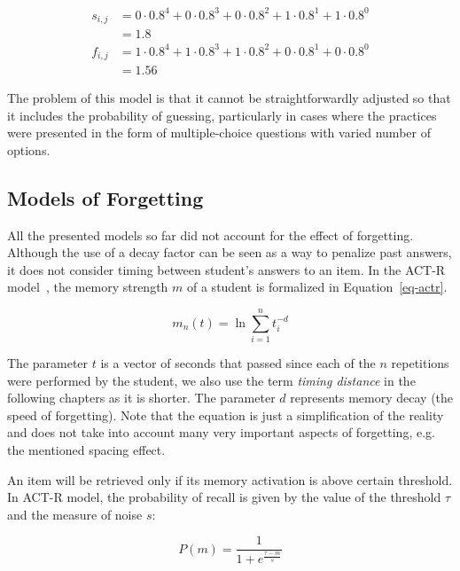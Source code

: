 \begin{equation} \label{eq-pfa-gong-example}
  \begin{split}
  s_{i,j} & = 0 \cdot 0.8^4 + 0 \cdot 0.8^3 + 0 \cdot 0.8^2 + 1 \cdot 0.8^1 + 1 \cdot 0.8^0 \\
  & = 1.8 \\
  f_{i,j} & = 1 \cdot 0.8^4 + 1 \cdot 0.8^3 + 1 \cdot 0.8^2 + 0 \cdot 0.8^1 + 0 \cdot 0.8^0 \\
  & = 1.56
  \end{split}
\end{equation}

The problem of this model is that it cannot be straightforwardly adjusted so that it includes the probability of guessing, particularly in cases where the practices were presented in the form of multiple-choice questions with varied number of options.

\subsection{Models of Forgetting}
\label{spacing-effect}

All the presented models so far did not account for the effect of forgetting. Although the use of a decay factor can be seen as a way to penalize past answers, it does not consider timing between student's answers to an item. In the ACT-R model~\cite{Pavlik2003}, the memory strength $m$ of a student is formalized in Equation~\ref{eq-actr}.

\begin{equation} \label{eq-actr}
  m_n(t) = \ln{\sum_{i=1}^{n} t_{i}^{-d}}
\end{equation}

The parameter $t$ is a vector of seconds that passed since each of the $n$ repetitions were performed by the student, we also use the term \textit{timing distance} in the following chapters as it is shorter. The parameter $d$ represents memory decay (the speed of forgetting). Note that the equation is just a simplification of the reality and does not take into account many very important aspects of forgetting, e.g. the mentioned spacing effect.

An item will be retrieved only if its memory activation is above certain threshold. In ACT-R model, the probability of recall is given by the value of the threshold $\tau$ and the measure of noise $s$: 

\begin{equation} \label{eq-actr-p}
  P(m) = \frac{1}{1 + e^{\frac{\tau - m}{s}}}
\end{equation}

